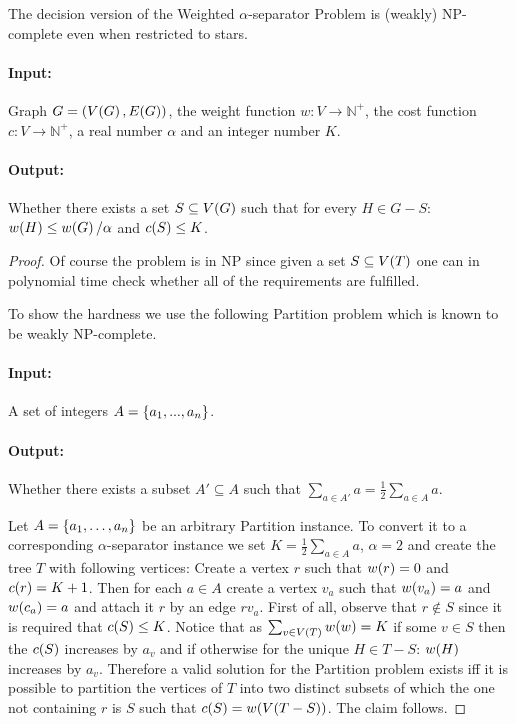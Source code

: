\begin{theorem}
    The decision version of the Weighted $\alpha$-separator Problem is (weakly) NP-complete even when restricted to stars.

\begin{tcolorbox}[colback=white, title=Decision weighted $\alpha$-separator problem, fonttitle=\bfseries, breakable]
\paragraph{Input:} Graph $G=\mathopen{}\left( V\mathopen{}\left( G \right), E\mathopen{}\left( G \right) \right)$, the weight function $w:V\to \mathbb{N}^+$, the cost function $c:V\to \mathbb{N}^+$, a real number $\alpha$ and an integer number $K$.
\paragraph{Output:} Whether there exists a set $S\subseteq V\mathopen{}\left( G \right)$ such that for every $H\in G-S$: $w\mathopen{}\left( H \right)\leq w\mathopen{}\left( G \right)/\alpha$ and $c\mathopen{}\left( S \right)\leq K$.
\end{tcolorbox}
    \begin{proof}
        Of course the problem is in NP since given a set $S\subseteq V\mathopen{}\left( T \right)$ one can in polynomial time check whether all of the requirements are fulfilled.

        To show the hardness we use the following Partition problem which is known to be weakly NP-complete.
        \begin{tcolorbox}[colback=white, title=Partition problem, fonttitle=\bfseries, breakable]
        \paragraph{Input:} A set of integers $A = \mathopen{}\left\{ a_1,...,a_n \right\}$.
        \paragraph{Output:} Whether there exists a subset $A'\subseteq A$ such that $\sum_{a\in A'}a=\frac{1}{2}\sum_{a\in A}a$.
        \end{tcolorbox}
        Let $A = \mathopen{}\left\{ a_1,\dots,a_n \right\}$ be an arbitrary Partition instance. To convert it to a corresponding $\alpha$-separator instance we set $K=\frac{1}{2}\sum_{a\in A}a$, $\alpha = 2$ and create the tree $T$ with following vertices: Create a vertex $r$ such that $w\mathopen{}\left( r \right) = 0$ and $c\mathopen{}\left( r \right)=K + 1$. Then for each $a\in A$ create a vertex $v_a$ such that $w\mathopen{}\left( v_a \right)=a$ and $w\mathopen{}\left( c_a \right)=a$ and attach it $r$ by an edge $rv_a$.
        First of all, observe that $r\notin S$ since it is required that $c\mathopen{}\left( S \right)\leq K$. Notice that as $\sum_{v\in V\mathopen{}\left( T \right)}w\mathopen{}\left( w \right)=K$ if some $v\in S$ then the $c\mathopen{}\left( S \right)$ increases by $a_v$ and if otherwise for the unique $H\in T-S$: $w\mathopen{}\left( H \right)$ increases by $a_v$. Therefore a valid solution for the Partition problem exists iff it is possible to partition the vertices of $T$ into two distinct subsets of which the one not containing $r$ is $S$ such that $c\mathopen{}\left( S \right) = w\mathopen{}\left( V\mathopen{}\left( T-S \right) \right)$. The claim follows.
    \end{proof}
\end{theorem}
